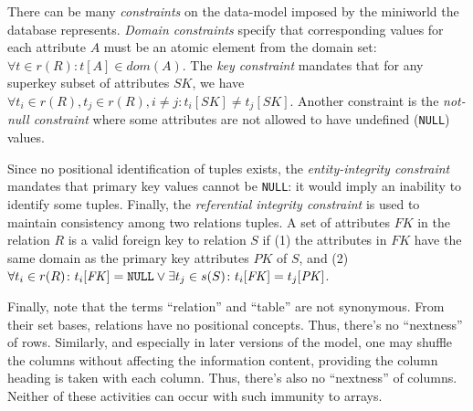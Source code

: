 \documentclass [a4paper, 12pt, twocolumn]{article}
\newcommand{\m}    {\mathit}            %
\newcommand{\<}    {\langle}            %
\renewcommand{\>}  {\rangle}            %
\begin{document}
There can be many \emph{constraints} on the data-model imposed by the
miniworld the database represents. \emph{Domain constraints} specify that
corresponding values for each attribute $A$ must be an atomic element from
the domain set: $\forall t \in r(R) \colon t[A] \in \m{dom}(A)$. The
\emph{key constraint} mandates that for any superkey subset of attributes
$\m{SK}$, we have $\forall
t_i \in r(R), t_j \in r(R), i \not= j \colon t_i[\m{SK}] \not= t_j[\m{SK}]$.
Another constraint is the \emph{not-null constraint} where some attributes
are not allowed to have undefined (\verb/NULL/) values.\cite{elmasri}

Since no positional identification of tuples exists, the
\emph{entity-integrity constraint} mandates that primary key values cannot be
\verb/NULL/: it would imply an inability to identify some tuples. Finally,
the \emph{referential integrity constraint} is used to maintain consistency
among two relations tuples. A set of attributes $\m{FK}$ in the relation $R$
is a valid foreign key to relation $S$ if (1) the attributes in $\m{FK}$ have
the same domain as the primary key attributes $\m{PK}$ of $S$, and (2)
$\forall t_i \in r(R) \colon
t_i[\m{FK}] = \hbox{\verb/NULL/} \lor
\exists t_j \in s(S) \colon t_i[\m{FK}] = t_j[\m{PK}]$.

Finally, note that the terms ``relation'' and ``table'' are not synonymous.
From their set bases, relations have no positional concepts. Thus, there's
no ``nextness'' of rows. Similarly, and especially in later versions of the
model, one may shuffle the columns without affecting the information content,
providing the column heading is taken with each column. Thus, there's also no
``nextness'' of columns. Neither of these activities can occur with such
immunity to arrays.\cite{codd-v2}
\end{document}
